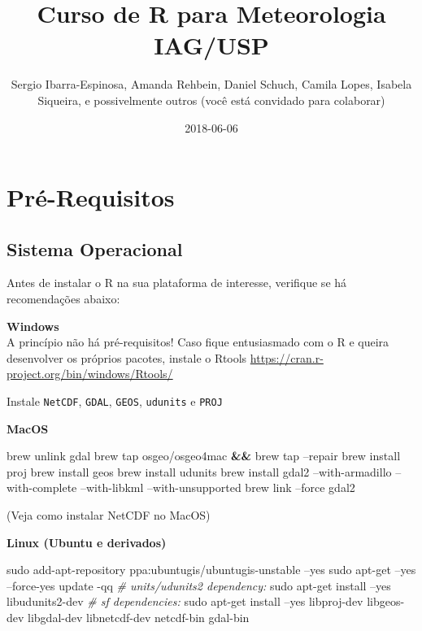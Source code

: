 \documentclass[]{book}
\title{Curso de R para Meteorologia IAG/USP}
\author{Sergio Ibarra-Espinosa, Amanda Rehbein, Daniel Schuch, Camila Lopes,
Isabela Siqueira, e possivelmente outros (você está convidado para
colaborar)}
\date{2018-06-06}
\newenvironment{Shaded}{\begin{snugshade}}{\end{snugshade}}
\newcommand{\KeywordTok}[1]{\textcolor[rgb]{0.13,0.29,0.53}{\textbf{#1}}}
\newcommand{\CommentTok}[1]{\textcolor[rgb]{0.56,0.35,0.01}{\textit{#1}}}
\newcommand{\FunctionTok}[1]{\textcolor[rgb]{0.00,0.00,0.00}{#1}}
\newcommand{\ExtensionTok}[1]{#1}
\newcommand{\NormalTok}[1]{#1}
\theoremstyle{definition}
\theoremstyle{definition}
\theoremstyle{definition}
\theoremstyle{remark}
\begin{document}
\maketitle

{
\setcounter{tocdepth}{1}
\tableofcontents
}
\chapter{Pré-Requisitos}\label{primero}

\section{Sistema Operacional}\label{sistema-operacional}

Antes de instalar o R na sua plataforma de interesse, verifique se há
recomendações abaixo:

\textbf{Windows}\\
A princípio não há pré-requisitos! Caso fique entusiasmado com o R e
queira desenvolver os próprios pacotes, instale o Rtools
\url{https://cran.r-project.org/bin/windows/Rtools/}

Instale \texttt{NetCDF}, \texttt{GDAL}, \texttt{GEOS}, \texttt{udunits}
e \texttt{PROJ}

\textbf{MacOS}

\begin{Shaded}
\begin{Highlighting}[]
\ExtensionTok{brew}\NormalTok{ unlink gdal}
\ExtensionTok{brew}\NormalTok{ tap osgeo/osgeo4mac }\KeywordTok{&&} \ExtensionTok{brew}\NormalTok{ tap --repair}
\ExtensionTok{brew}\NormalTok{ install proj}
\ExtensionTok{brew}\NormalTok{ install geos}
\ExtensionTok{brew}\NormalTok{ install udunits}
\ExtensionTok{brew}\NormalTok{ install gdal2 --with-armadillo --with-complete --with-libkml --with-unsupported}
\ExtensionTok{brew}\NormalTok{ link --force gdal2}
\end{Highlighting}
\end{Shaded}

(Veja como instalar NetCDF no MacOS)

\textbf{Linux (Ubuntu e derivados)}

\begin{Shaded}
\begin{Highlighting}[]
\FunctionTok{sudo}\NormalTok{ add-apt-repository ppa:ubuntugis/ubuntugis-unstable --yes}
\FunctionTok{sudo}\NormalTok{ apt-get --yes --force-yes update -qq}
\CommentTok{# units/udunits2 dependency:}
\FunctionTok{sudo}\NormalTok{ apt-get install --yes libudunits2-dev}
\CommentTok{# sf dependencies:}
\FunctionTok{sudo}\NormalTok{ apt-get install --yes libproj-dev libgeos-dev libgdal-dev libnetcdf-dev  netcdf-bin gdal-bin}
\end{Highlighting}
\end{Shaded}
\end{document}
